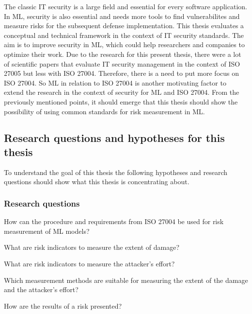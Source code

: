 The classic IT security is a large field and essential for every software application. In ML, security is also essential and needs more tools to find vulnerabilites and measure risks for
the subsequent defense implementation. This thesis evaluates a conceptual and technical framework in the context of IT security standards. The aim is to improve security in ML, which could
help researchers and companies to optimize their work. Due to the research for this present thesis, there were a lot of scientific papers that evaluate IT security management in the
context of ISO 27005 but less with ISO 27004. Therefore, there is a need to put more focus on ISO 27004. So ML in relation to ISO 27004 is another motivating factor to extend the research
in the context of security for ML and ISO 27004. From the previously mentioned points, it should emerge that this thesis should show the possibility of using common standards for risk
measurement in ML.

\subsection{Research questions and hypotheses for this thesis}


To understand the goal of this thesis the following hypotheses and research questions should show what this thesis is concentrating about.

\subsubsection*{Research questions}

\begin{questions}
  \item How can the procedure and requirements from ISO 27004 be used for risk measurement of ML models? \label{itm:rq1}
  \item What are risk indicators to measure the extent of damage? \label{itm:rq2}
  \item What are risk indicators to measure the attacker's effort? \label{itm:rq3}
  \item Which measurement methods are suitable for measuring the extent of the damage and the attacker's effort? \label{itm:rq4}
  \item How are the results of a risk presented? \label{itm:rq5}
\end{questions}

